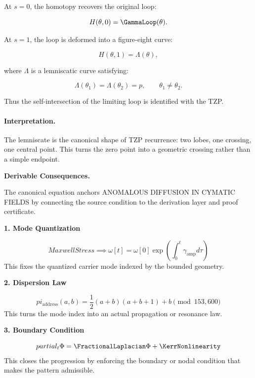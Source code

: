 At $s=0$, the homotopy recovers the original loop:

\begin{equation}
H(\theta,0)=\GammaLoop(\theta).
\end{equation}

At $s=1$, the loop is deformed into a figure-eight curve:

\begin{equation}
H(\theta,1)=\Lambda(\theta),
\end{equation}

where $\Lambda$ is a lemniscatic curve satisfying:

\begin{equation}
\Lambda(\theta_1)=\Lambda(\theta_2)=p,
\qquad
\theta_1\neq\theta_2 .
\end{equation}

Thus the self-intersection of the limiting loop is identified with the TZP.

\paragraph{Interpretation.}
The lemniscate is the canonical shape of TZP recurrence: two lobes, one crossing, one central point. This turns the zero point into a geometric crossing rather than a simple endpoint.

\par\vspace{0.35em}
\noindent\textbf{Derivable Consequences.}\quad
\begingroup
\footnotesize
\raggedright
The canonical equation anchors ANOMALOUS DIFFUSION IN CYMATIC FIELDS by connecting the source condition to the derivation layer and proof certificate.
\par\endgroup

\noindent\textbf{1. Mode Quantization}\par
\[
MaxwellStress \implies \omega[t] = \omega[0] \exp\left(\int_0^t \gamma_{\text{amp}} d\tau\right)
\]
\noindent This fixes the quantized carrier mode indexed by the bounded geometry.\par
\noindent\textbf{2. Dispersion Law}\par
\[
pi_{\text{address}}(a, b) = \frac{1}{2}(a+b)(a+b+1) + b \pmod{153,600}
\]
\noindent This turns the mode index into an actual propagation or resonance law.\par
\noindent\textbf{3. Boundary Condition}\par
\[
partial_t \Phi = \FractionalLaplacian \Phi + \KerrNonlinearity
\]
\noindent This closes the progression by enforcing the boundary or nodal condition that makes the pattern admissible.\par

